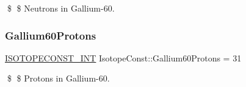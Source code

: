 \$ \$ Neutrons in Gallium-\/60. \mbox{\label{group___isotope_const-_gallium-_ga60_gab2f1a6f2be70737ded3924f132def1ab}} 
\subsubsection{\texorpdfstring{Gallium60\+Protons}{Gallium60Protons}}
{\footnotesize\ttfamily \mbox{\hyperlink{group___isotope_const-_macros_ga5f18360b3e99483a35c32d789e62621c}{I\+S\+O\+T\+O\+P\+E\+C\+O\+N\+S\+T\+\_\+\+I\+NT}} Isotope\+Const\+::\+Gallium60\+Protons = 31}

\$ \$ Protons in Gallium-\/60. 